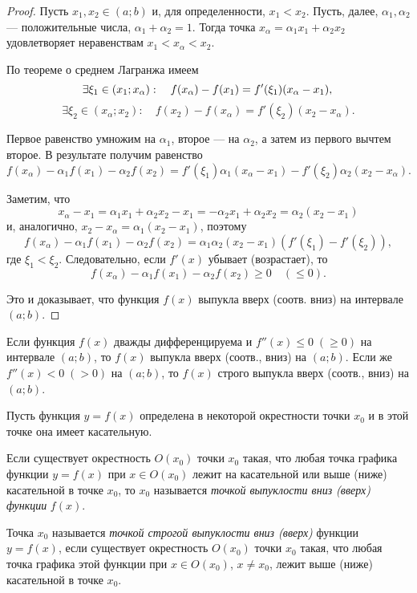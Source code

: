 \begin{proof}
Пусть $x_1,x_2\in(a;b)$ и, для определенности, $x_1<x_2$. Пусть, далее, $\alpha_1, \alpha_2$ --- положительные числа, $\alpha_1+\alpha_2=1$. Тогда точка $x_\alpha=\alpha_1x_1+\alpha_2x_2$ удовлетворяет неравенствам $x_1<x_\alpha<x_2$.

По теореме о среднем Лагранжа имеем
$$
\exists \xi_1\in(x_1;x_\alpha):\quad f(x_\alpha)-f(x_1)=f'(\xi_1)(x_\alpha-x_1),\\
$$
$$
\exists \xi_2\in(x_\alpha;x_2):\quad f(x_2)-f(x_\alpha)=f'(\xi_2)(x_2-x_\alpha).
$$

Первое равенство умножим на $\alpha_1$, второе  --- на $\alpha_2$, а затем из первого вычтем второе. В результате получим равенство
$$
f(x_\alpha)-\alpha_1f(x_1)-\alpha_2f(x_2)=f'(\xi_1)\alpha_1(x_\alpha-x_1)-f'(\xi_2)\alpha_2(x_2-x_\alpha).
$$

Заметим, что 
$$
x_\alpha-x_1=\alpha_1x_1+\alpha_2x_2-x_1=-\alpha_2x_1+\alpha_2x_2=\alpha_2(x_2-x_1)
$$
и, аналогично, $x_2-x_\alpha=\alpha_1(x_2-x_1)$, поэтому
$$
f(x_\alpha)-\alpha_1f(x_1)-\alpha_2f(x_2)=\alpha_1\alpha_2(x_2-x_1)(f'(\xi_1)-f'(\xi_2)),
$$
где $\xi_1<\xi_2$. Следовательно, если $f'(x)$ убывает (возрастает), то 
$$
f(x_\alpha)-\alpha_1f(x_1)-\alpha_2f(x_2)\geq 0 \quad(\leq 0).
$$

Это и доказывает, что функция $f(x)$ выпукла вверх (соотв. вниз) на интервале $(a;b)$.
\end{proof}
\begin{cons}
Если функция $f(x)$ дважды дифференцируема и $f''(x)\leq 0\;(\geq 0)$ на интервале $(a;b)$, то $f(x)$ выпукла вверх \textup{(}соотв., вниз\textup{)} на $(a;b)$. Если же $f''(x)<0\;(>0)$ на $(a;b)$, то $f(x)$ строго выпукла вверх \textup{(}соотв., вниз\textup{)} на $(a;b)$.
\end{cons}


Пусть функция $y=f(x)$ определена в некоторой окрестности точки $x_0$ и в этой точке она имеет касательную.

\begin{defn}
Если существует окрестность $O(x_0)$ точки $x_0$ такая, что любая точка графика функции $y=f(x)$ при $x\in O(x_0)$ лежит на касательной или выше (ниже) касательной в точке $x_0$, то $x_0$ называется \textit{точкой выпуклости вниз \textup{(}вверх\textup{)} функции } $f(x)$.
\end{defn}

\begin{defn}
Точка $x_0$ называется \textit{точкой строгой выпуклости вниз (вверх)} функции $y=f(x)$, если существует окрестность $O(x_0)$ точки $x_0$ такая, что любая точка графика этой функции при $x\in O(x_0)$, $x\neq x_0$, лежит выше (ниже) касательной в точке $x_0$.
\end{defn}


